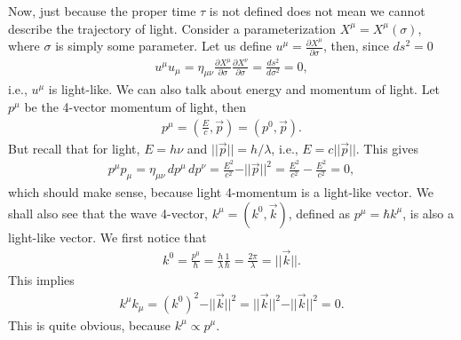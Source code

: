 \documentclass{book}
\theoremstyle{definition}
\begin{document}
Now, just because the proper time $\tau$ is not defined does not mean we cannot describe the trajectory of light. Consider a parameterization $X^\mu = X^\mu(\sigma)$, where $\sigma$ is simply some parameter. Let us define $u^\mu = \frac{\partial X^\mu}{\partial \sigma}$, then, since $ds^2 = 0$
\begin{align*}
u^\mu u_\mu = \eta_{\mu\nu}\frac{\partial X^\mu}{\partial \sigma}\frac{\partial X^\nu}{\partial \sigma} = \frac{ds^2}{d\sigma^2} = 0,
\end{align*}
i.e., $u^\mu$ is light-like. We can also talk about energy and momentum of light. Let $p^\mu$ be the 4-vector momentum of light, then
\begin{align*}
p^\mu = \left( \frac{E}{c}, \vec{p} \right) = \left( p^0, \vec{p} \right).   
\end{align*}
But recall that for light, $E = h\nu$ and $\vert\vert \vec{p} \vert\vert = h/\lambda$, i.e., $E = c\vert\vert \vec{p}\vert\vert$. This gives
\begin{align*}
p^\mu p_\mu = \eta_{\mu\nu}\,dp^\mu\,dp^\nu = \frac{E^2}{c^2} - \vert\vert\vec{p}\vert\vert^2 = \frac{E^2}{c^2} - \frac{E^2}{c^2} = 0,
\end{align*}
which should make sense, because light 4-momentum is a light-like vector. We shall also see that the wave 4-vector, $k^\mu = \left( k^0, \vec{k} \right)$, defined as $p^\mu = \hbar k^\mu$, is also a light-like vector. We first notice that 
\begin{align*}
k^0 = \frac{p^0}{\hbar} = \frac{h}{\lambda}\frac{1}{\hbar} = \frac{2\pi}{\lambda} = \vert\vert \vec{k} \vert\vert.
\end{align*}
This implies
\begin{align*}
k^\mu k_\mu = \left( k^0 \right) ^2 - \vert\vert\vec{k}\vert\vert^2 =  \vert\vert\vec{k}\vert\vert^2-\vert\vert\vec{k}\vert\vert^2=0.
\end{align*}
This is quite obvious, because $k^\mu \propto p^\mu$.\\
\end{document}
